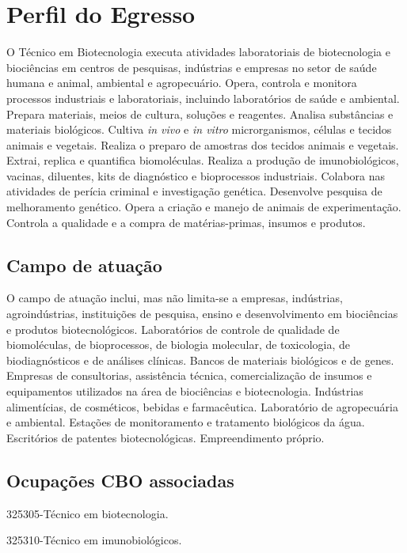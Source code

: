 \documentclass[11pt,fleqn]{book} %
\begin{document}
\section{Perfil do Egresso}

O Técnico em Biotecnologia executa atividades laboratoriais de biotecnologia e biociências em centros de pesquisas, indústrias e empresas no setor de saúde humana e animal, ambiental e agropecuário. 
Opera, controla e monitora processos industriais e laboratoriais, incluindo laboratórios de saúde e ambiental. 
Prepara materiais, meios de cultura, soluções e reagentes. 
Analisa substâncias e materiais biológicos. 
Cultiva \textit{in vivo} e \textit{in vitro} microrganismos, células e tecidos animais e vegetais. 
Realiza o preparo de amostras dos tecidos animais e vegetais. 
Extrai, replica e quantifica biomoléculas.
Realiza a produção de imunobiológicos, vacinas, diluentes, kits de diagnóstico e bioprocessos industriais. 
Colabora nas atividades de perícia criminal e investigação genética. 
Desenvolve pesquisa de melhoramento genético. 
Opera a criação e manejo de animais de experimentação. 
Controla a qualidade e a compra de matérias-primas, insumos e produtos.

\subsection{Campo de atuação}

O campo de atuação inclui, mas não limita-se a empresas, indústrias, agroindústrias, instituições de pesquisa, ensino e desenvolvimento em biociências e produtos biotecnológicos.
Laboratórios de controle de qualidade de biomoléculas, de bioprocessos, de biologia molecular, de toxicologia, de biodiagnósticos e de análises clínicas. 
Bancos de materiais biológicos e de genes. 
Empresas de consultorias, assistência técnica, comercialização de insumos e equipamentos utilizados na área de biociências e biotecnologia. 
Indústrias alimentícias, de cosméticos, bebidas e farmacêutica. 
Laboratório de agropecuária e ambiental. 
Estações de monitoramento e tratamento biológicos da água. 
Escritórios de patentes biotecnológicas. 
Empreendimento próprio.

\subsection{Ocupações CBO associadas}

325305-Técnico em biotecnologia. 

325310-Técnico em imunobiológicos.
\end{document}
